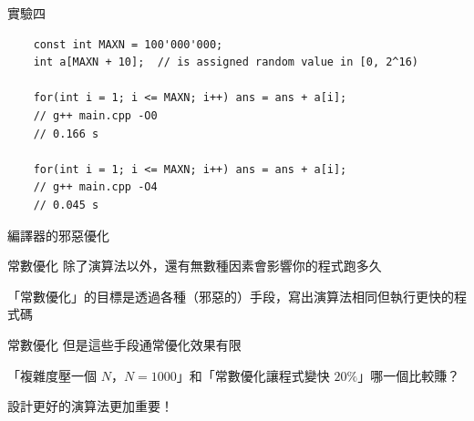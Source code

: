 \documentclass[aspectratio=169]{beamer}
\begin{document}
\begin{frame}[fragile]{實驗四}
  \begin{verbatim}
    const int MAXN = 100'000'000;
    int a[MAXN + 10];  // is assigned random value in [0, 2^16)

    for(int i = 1; i <= MAXN; i++) ans = ans + a[i];
    // g++ main.cpp -O0
    // 0.166 s
    
    for(int i = 1; i <= MAXN; i++) ans = ans + a[i];
    // g++ main.cpp -O4
    // 0.045 s
  \end{verbatim}

  編譯器的邪惡優化
\end{frame}

\begin{frame}{常數優化}
  除了演算法以外，還有無數種因素會影響你的程式跑多久

  「常數優化」的目標是透過各種（邪惡的）手段，寫出演算法相同但執行更快的程式碼
\end{frame}

\begin{frame}{常數優化}
  但是這些手段通常優化效果有限

  「複雜度壓一個 $N$，$N = 1000$」和「常數優化讓程式變快 $20\%$」哪一個比較賺？

  設計更好的演算法更加重要！
\end{frame}
\end{document}
